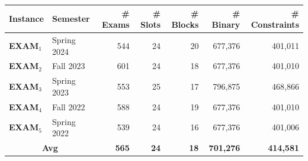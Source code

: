 \begin{tabular}{llrrrrr}
\toprule
\textbf{Instance} & \textbf{Semester} & \textbf{\# Exams} & \textbf{\# Slots} & \textbf{\# Blocks} & \textbf{\# Binary} & \textbf{\# Constraints} \\
\midrule
\textbf{EXAM$_1$} & Spring 2024 & 544 & 24 & 20 & 677{,}376 & 401{,}011 \\
\textbf{EXAM$_2$} & Fall 2023 & 601 & 24 & 18 & 677{,}376 & 401{,}010 \\
\textbf{EXAM$_3$} & Spring 2023 & 553 & 25 & 17 & 796{,}875 & 468{,}866 \\
\textbf{EXAM$_4$} & Fall 2022 & 588 & 24 & 19 & 677{,}376 & 401{,}010 \\
\textbf{EXAM$_5$} & Spring 2022 & 539 & 24 & 16 & 677{,}376 & 401{,}006 \\
\midrule
\multicolumn{2}{c}{\textbf{Avg}} & \textbf{565} & \textbf{24} & \textbf{18} & \textbf{701{,}276} & \textbf{414{,}581} \\
\bottomrule
\end{tabular}
